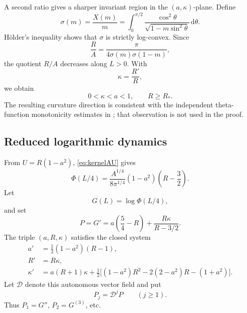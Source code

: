 \documentclass{amsart}
\numberwithin{equation}{section}
\theoremstyle{definition}
\theoremstyle{remark}
\newcommand{\D}{\mathrm d}
\newcommand{\Rstar}{R_*}
\begin{document}
A second ratio gives a sharper invariant region in the $(a,\kappa)$-plane.  Define
\begin{equation}\label{eq:sigmaell}
 \sigma(m)=\frac{X(m)}m
 =\int_0^{\pi/2}\frac{\cos^2\theta}{\sqrt{1-m\sin^2\theta}}\,\D\theta.
\end{equation}
H\"older's inequality shows that $\sigma$ is strictly log-convex.  Since
\begin{equation}\label{eq:RoverA}
 \frac RA=\frac{\pi}{4\sigma(m)\sigma(1-m)},
\end{equation}
the quotient $R/A$ decreases along $L>0$.  With
\begin{equation}\label{eq:kappa}
 \kappa=\frac{R'}R,
\end{equation}
we obtain
\begin{equation}\label{eq:wedge}
 \boxed{\qquad 0<\kappa<a<1,\qquad R\ge\Rstar.\qquad}
\end{equation}
The resulting curvature direction is consistent with the independent theta-function monotonicity estimates in \cite{Faulhuber2021}; that observation is not used in the proof.

\subsection{Reduced logarithmic dynamics}
From $U=R(1-a^2)$, \eqref{eq:kernelAU} gives
\begin{equation}\label{eq:Sfactor}
 \Phi(L/4)=\frac{A^{1/4}}{8\pi^{1/4}}
 (1-a^2)\left(R-\frac32\right).
\end{equation}
Let
\begin{equation}\label{eq:Gphase}
 G(L)=\log\Phi(L/4),
\end{equation}
and set
\begin{equation}\label{eq:Pphase}
 P=G'=a\left(\frac54-R\right)
 +\frac{R\kappa}{R-3/2}.
\end{equation}
The triple $(a,R,\kappa)$ satisfies the closed system
\begin{equation}\label{eq:aRk}
\boxed{\begin{aligned}
 a'&=\tfrac12(1-a^2)(R-1),\\
 R'&=R\kappa,\\
 \kappa'&=a(R+1)\kappa
 +\tfrac12\bigl[(1-a^2)R^2-2(2-a^2)R-(1+a^2)\bigr].
\end{aligned}}
\end{equation}
Let $\mathcal D$ denote this autonomous vector field and put
\begin{equation}\label{eq:Pj}
 P_j=\mathcal D^jP\qquad(j\ge1).
\end{equation}
Thus $P_1=G''$, $P_2=G^{(3)}$, etc.
\end{document}
